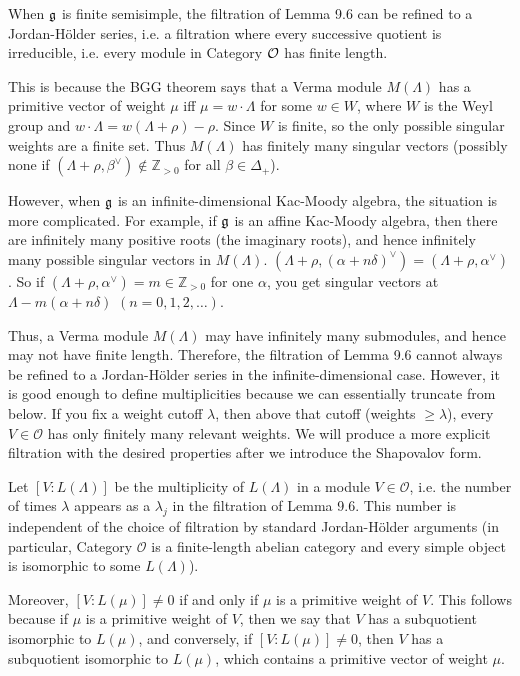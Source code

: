 \documentclass[12pt]{article}
\begin{document}
\begin{remark}
    When $\mathfrak{g}$ is finite semisimple, the filtration of Lemma 9.6 can be refined to a Jordan-Hölder series, i.e. a filtration where every successive quotient is irreducible, i.e. every module in Category ${\mathcal{O}}$ has finite length.

    This is because the BGG theorem says that a Verma module $M(\Lambda)$ has a primitive vector of weight $\mu$ iff $\mu=w\!\cdot\!\Lambda$ for some $w\in W$, where $W$ is the Weyl group and $w\!\cdot\!\Lambda=w(\Lambda+\rho)-\rho$. Since $W$ is finite, so the only possible singular weights are a finite set. Thus $M(\Lambda)$ has finitely many singular vectors (possibly none if $(\Lambda+\rho,\beta^\vee)\notin\mathbb Z_{>0}$ for all $\beta\in\Delta_+$).


    However, when $\mathfrak{g}$ is an infinite-dimensional Kac-Moody algebra, the situation is more complicated. For example, if $\mathfrak{g}$ is an affine Kac-Moody algebra, then there are infinitely many positive roots (the imaginary roots), and hence infinitely many possible singular vectors in $M(\Lambda)$. $(\Lambda+\rho,(\alpha+n\delta)^\vee)=(\Lambda+\rho,\alpha^\vee)$. So if $(\Lambda+\rho,\alpha^\vee)=m\in\mathbb{Z}_{>0}$ for one $\alpha$, you get singular vectors at $\Lambda-m(\alpha+n\delta)$ $(n=0,1,2,\dots)$.


    Thus, a Verma module $M(\Lambda)$ may have infinitely many submodules, and hence may not have finite length. Therefore, the filtration of Lemma 9.6 cannot always be refined to a Jordan-Hölder series in the infinite-dimensional case. However, it is good enough to define multiplicities because we can essentially truncate from below. If you fix a weight cutoff $\lambda$, then above that cutoff (weights $\geq \lambda$), every $V\in\mathcal O$ has only finitely many relevant weights. We will produce a more explicit filtration with the desired properties after we introduce the Shapovalov form.
\end{remark}

Let $[V:L(\Lambda)]$ be the multiplicity of $L(\Lambda)$ in a module $V \in \mathcal{O}$, i.e. the number of times $\lambda$ appears as a $\lambda_j$ in the filtration of Lemma 9.6. This number is independent of the choice of filtration by standard Jordan-Hölder arguments (in particular, Category $\mathcal{O}$ is a finite-length abelian category and every simple object is isomorphic to some $L(\Lambda)$).

Moreover, $[V:L(\mu)] \neq 0$ if and only if $\mu$ is a primitive weight of $V$. This follows because if $\mu$ is a primitive weight of $V$, then we say that $V$ has a subquotient isomorphic to $L(\mu)$, and conversely, if $[V:L(\mu)] \neq 0$, then $V$ has a subquotient isomorphic to $L(\mu)$, which contains a primitive vector of weight $\mu$.
\end{document}
